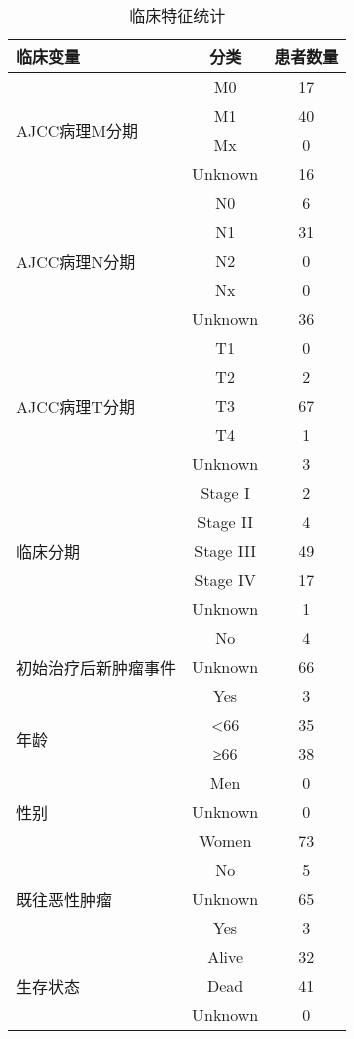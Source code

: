 \begin{table}[htbp]
\centering
\caption{临床特征统计}
\begin{tabular}{lcc}
\toprule
\textbf{临床变量} & \textbf{分类} & \textbf{患者数量} \\
\midrule
\multirow{4}{*}{AJCC病理M分期} & M0 & 17 \\
 & M1 & 40 \\
 & Mx & 0 \\
 & Unknown & 16 \\
\midrule
\multirow{5}{*}{AJCC病理N分期} & N0 & 6 \\
 & N1 & 31 \\
 & N2 & 0 \\
 & Nx & 0 \\
 & Unknown & 36 \\
\midrule
\multirow{5}{*}{AJCC病理T分期} & T1 & 0 \\
 & T2 & 2 \\
 & T3 & 67 \\
 & T4 & 1 \\
 & Unknown & 3 \\
\midrule
\multirow{5}{*}{临床分期} & Stage I & 2 \\
 & Stage II & 4 \\
 & Stage III & 49 \\
 & Stage IV & 17 \\
 & Unknown & 1 \\
\midrule
\multirow{3}{*}{初始治疗后新肿瘤事件} & No & 4 \\
 & Unknown & 66 \\
 & Yes & 3 \\
\midrule
\multirow{2}{*}{年龄} & <66 & 35 \\
 & ≥66 & 38 \\
\midrule
\multirow{3}{*}{性别} & Men & 0 \\
 & Unknown & 0 \\
 & Women & 73 \\
\midrule
\multirow{3}{*}{既往恶性肿瘤} & No & 5 \\
 & Unknown & 65 \\
 & Yes & 3 \\
\midrule
\multirow{3}{*}{生存状态} & Alive & 32 \\
 & Dead & 41 \\
 & Unknown & 0 \\
\bottomrule
\end{tabular}
\label{tab:clinical_stats_booktabs}
\end{table}